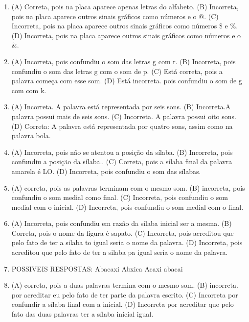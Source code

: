 \begin{enumerate}
\item
(A) Correta, pois na placa aparece apenas letras do alfabeto.
(B) Incorreta, pois na placa aparece outros sinais gráficos como números
e o @.
(C) Incorreta, pois na placa aparece outros sinais gráficos como números
\$ e \%.
(D) Incorreta, pois na placa aparece outros sinais gráficos como números
e o \&.

\item
(A) Incorreta, pois confundiu o som das letras g com r.
(B) Incorreta, pois confundiu o som das letras g com o som de p.
(C) Está correta, pois a palavra começa com esse som.
(D) Está incorreta. pois confundiu o som de g com com k.

\item
(A) Incorreta. A palavra está representada por seis sons.
(B) Incorreta.A palavra possui mais de seis sons.
(C) Incorreta. A palavra possui oito sons.
(D) Correta: A palavra está representada por quatro sons, assim como na
palavra bola.

\item
(A) Incorreta, pois não se atentou a posição da sílaba.
(B) Incorreta, pois confundiu a posição da sílaba..
(C) Correta, pois a sílaba final da palavra amarela é LO.
(D) Incorreta, pois confundiu o som das sílabas.

\item
(A) correta, pois as palavras terminam com o mesmo som.
(B) incorreta, pois confundiu o som medial como final.
(C) Incorreta, pois confundiu o som medial com o inicial.
(D) Incorreta, pois confundiu o som medial com o final.

\item
(A) Incorreta, pois confundiu em razão da sílaba inicial ser a mesma.
(B) Correta, pois o nome da figura é sapato.
(C) Incorreta, pois acreditou que pelo fato de ter a silaba to igual seria o nome da palavra.
(D) Incorreta, pois acreditou que pelo fato de ter a silaba pa igual seria o nome da palavra.

\item
POSSIVEIS RESPOSTAS:
Abacaxi
Abxica
Acaxi
abacai

\item
(A) correta, pois a duas palavras termina com o mesmo som.
(B) incorreta. por acreditar eu pelo fato de ter parte da palavra escrito.
(C) Incorreta por confundir a sílaba final com a inicial.
(D) Incorreta por acreditar que pelo fato das duas palavras ter a sílaba inicial igual.


\end{enumerate}
